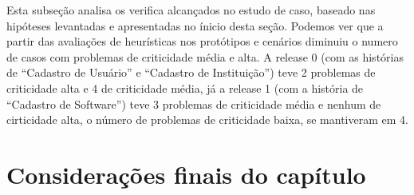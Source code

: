 Esta subseção analisa os verifica alcançados no estudo de caso, baseado nas hipóteses levantadas e apresentadas no ínicio desta seção. Podemos ver que a partir das avaliações de heurísticas nos protótipos e cenários diminuiu o numero de casos com problemas de criticidade média e alta. A release 0 (com as histórias de ``Cadastro de Usuário'' e ``Cadastro de Instituição'') teve 2 problemas de criticidade alta e 4 de criticidade média, já a release 1 (com a história de ``Cadastro de Software'') teve 3 problemas de criticidade média e nenhum de cirticidade alta, o número de problemas de criticidade baixa, se mantiveram em 4.



\section{Considerações finais do capítulo}







